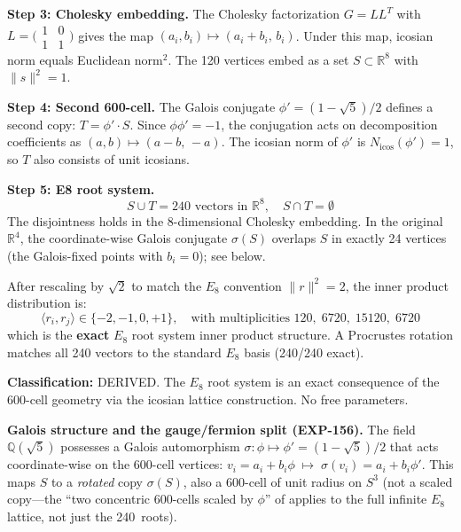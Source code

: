 \documentclass[12pt,a4paper]{article}
\begin{document}
\textbf{Step 3: Cholesky embedding.} The Cholesky factorization $G = LL^T$ with $L = \bigl(\begin{smallmatrix}1&0\\1&1\end{smallmatrix}\bigr)$ gives the map $(a_i, b_i) \mapsto (a_i + b_i,\, b_i)$. Under this map, icosian norm equals Euclidean norm$^2$. The 120 vertices embed as a set $S \subset \mathbb{R}^8$ with $\|s\|^2 = 1$.

\textbf{Step 4: Second 600-cell.} The Galois conjugate $\phi' = (1-\sqrt{5})/2$ defines a second copy: $T = \phi' \cdot S$. Since $\phi\phi' = -1$, the conjugation acts on decomposition coefficients as $(a,b) \mapsto (a-b,\,-a)$. The icosian norm of $\phi'$ is $N_{\text{icos}}(\phi') = 1$, so $T$ also consists of unit icosians.

\textbf{Step 5: E8 root system.}
\begin{equation}
\boxed{S \cup T = 240 \text{ vectors in } \mathbb{R}^8, \quad S \cap T = \emptyset}
\end{equation}
The disjointness holds in the 8-dimensional Cholesky embedding. In the original $\mathbb{R}^4$, the coordinate-wise Galois conjugate $\sigma(S)$ overlaps $S$ in exactly 24 vertices (the Galois-fixed points with $b_i = 0$); see below.

After rescaling by $\sqrt{2}$ to match the $E_8$ convention $\|r\|^2 = 2$, the inner product distribution is:
\begin{equation}
\langle r_i, r_j \rangle \in \{-2, -1, 0, +1\}, \quad \text{with multiplicities } 120,\; 6720,\; 15120,\; 6720
\end{equation}
which is the \textbf{exact} $E_8$ root system inner product structure. A Procrustes rotation matches all 240 vectors to the standard $E_8$ basis (240/240 exact).

\textbf{Classification:} DERIVED. The $E_8$ root system is an exact consequence of the 600-cell geometry via the icosian lattice construction. No free parameters.

\textbf{Galois structure and the gauge/fermion split (EXP-156).} The field $\mathbb{Q}(\sqrt{5})$ possesses a Galois automorphism $\sigma: \phi \mapsto \phi' = (1-\sqrt{5})/2$ that acts coordinate-wise on the 600-cell vertices: $v_i = a_i + b_i\phi \;\mapsto\; \sigma(v_i) = a_i + b_i\phi'$. This maps $S$ to a \emph{rotated} copy $\sigma(S)$, also a 600-cell of unit radius on $S^3$ (not a scaled copy---the ``two concentric 600-cells scaled by $\phi$'' of \cite{elser1987} applies to the full infinite $E_8$ lattice, not just the 240~roots).
\end{document}
